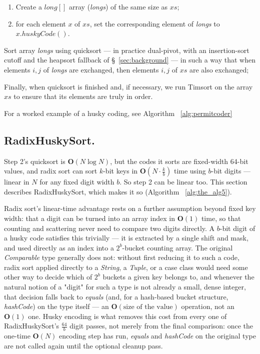 \documentclass[twoside,leqno,twocolumn]{article}
\begin{document}
\begin{steps}
\item  
\renewcommand{\labelenumi}{\alph{enumi}}
    \begin{enumerate}
    \item Create a $long[]$ array (\emph{longs}) of the same size as $xs$;
    \item for each element $x$ of $xs$, set the corresponding element of \emph{longs} to $x.huskyCode()$.
    \end{enumerate}
\item {}Sort array \emph{longs} using quicksort --- in practice dual-pivot, with an insertion-sort
cutoff and the heapsort fallback of \S~\ref{sec:background} ---
in such a way that when elements $i, j$ of \emph{longs} are exchanged, then elements $i, j$ of $xs$ are also exchanged;
\item {}Finally, when quicksort is finished and, if necessary,
we run Timsort on the array $xs$ to ensure that its elements are truly in order.
\end{steps}

For a worked example of a husky coding, see Algorithm ~\ref{alg:permitcoder}

\subsection{RadixHuskySort.}
\label{sec:radix}

Step 2's quicksort is $\textbf{O}(N \log N)$, but the codes it sorts are fixed-width 64-bit values,
and radix sort can sort $k$-bit keys in $\textbf{O}(N \cdot \frac{k}{b})$ time using $b$-bit digits ---
linear in $N$ for any fixed digit width $b$.
So step 2 can be linear too.
This section describes RadixHuskySort, which makes it so (Algorithm ~\ref{alg:the_alg5}).

Radix sort's linear-time advantage rests on a further assumption beyond fixed key width:
that a digit can be turned into an array index in $\textbf{O}(1)$ time,
so that counting and scattering never need to compare two digits directly.
A $b$-bit digit of a husky code satisfies this trivially —
it is extracted by a single shift and mask, and used directly as an index into a $2^b$-bucket counting array.
The original \textit{Comparable} type generally does not:
without first reducing it to such a code, radix sort applied directly to a \textit{String},
a \textit{Tuple}, or a case class would need some other way to decide which of $2^b$ buckets a given key belongs to,
and whenever the natural notion of a "digit" for such a type is not already a small, dense integer,
that decision falls back to \textit{equals} (and, for a hash-based bucket structure,
\textit{hashCode}) on the type itself — an $\textbf{O}(\text{size of the value})$ operation, not an $\textbf{O}(1)$ one.
Husky encoding is what removes this cost from every one of RadixHuskySort's $\frac{64}{b}$ digit passes,
not merely from the final comparison:
once the one-time $\textbf{O}(N)$ encoding step has run,
\textit{equals} and \textit{hashCode} on the original type are not called again until the optional cleanup pass.
\end{document}
